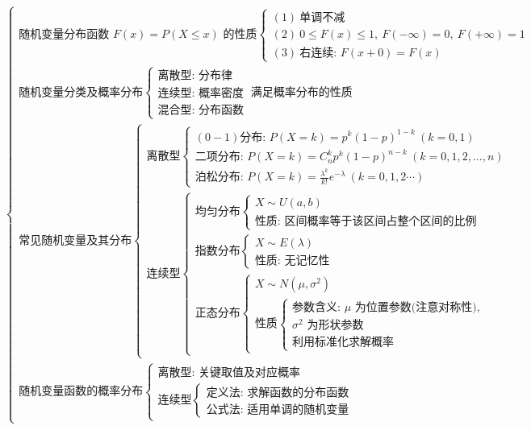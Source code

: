 ﻿\documentclass[lang=cn,11pt]{elegantbook}
\begin{document}
{\small
\[
\begin{cases}
\text{随机变量分布函数 } F(x) = P(X \le x) \text{ 的性质}
\begin{cases}
(1)\ \text{单调不减} \\
(2)\ 0 \le F(x) \le 1,\ F(-\infty)=0,\ F(+\infty)=1 \\
(3)\ \text{右连续: } F(x+0) = F(x)
\end{cases} \\[1em]
\text{随机变量分类及概率分布}
\begin{cases}
\text{离散型: 分布律} \\
\text{连续型: 概率密度} \\
\text{混合型: 分布函数}
\end{cases}
\ \text{满足概率分布的性质} \\[1em]
\text{常见随机变量及其分布}
\begin{cases}
\text{离散型}
\begin{cases}
(0-1)\text{分布: } P(X=k) = p^k(1-p)^{1-k}\ (k=0,1) \\
\text{二项分布: } P(X=k) = C_n^k p^k(1-p)^{n-k}\ (k=0,1,2,\dots,n) \\
\text{泊松分布: } P(X=k) = \frac{\lambda^k}{k!}e^{-\lambda}\ (k=0,1,2\cdots)
\end{cases} \\[2em]
\text{连续型}
\begin{cases}
\text{均匀分布}
\begin{cases}
X \sim U(a,b) \\
\text{性质: 区间概率等于该区间占整个区间的比例}
\end{cases} \\
\text{指数分布}
\begin{cases}
X \sim E(\lambda) \\
\text{性质: 无记忆性}
\end{cases} \\
\text{正态分布}
\begin{cases}
X \sim N(\mu,\sigma^2) \\
\text{性质}
\begin{cases}
\text{参数含义: } \mu \text{ 为位置参数(注意对称性),} \\
\sigma^2 \text{ 为形状参数} \\
\text{利用标准化求解概率}
\end{cases}
\end{cases}
\end{cases}
\end{cases} \\[1em]
\text{随机变量函数的概率分布}
\begin{cases}
\text{离散型: 关键取值及对应概率} \\
\text{连续型}
\begin{cases}
\text{定义法: 求解函数的分布函数} \\
\text{公式法: 适用单调的随机变量}
\end{cases}
\end{cases}
\end{cases}
\]
}
\end{document}
